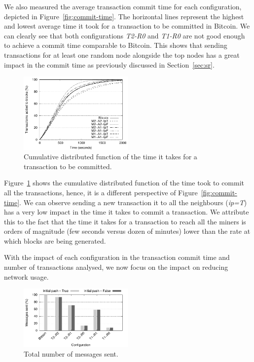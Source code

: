 \documentclass{dads}   %
\begin{document}
We also measured the average transaction commit time for each configuration, depicted in Figure~\ref{fig:commit-time}.   
The horizontal lines represent the highest and lowest average time it took for a transaction to be committed in Bitcoin. We can clearly see that both configurations \textsl{T2-R0} and \textsl{T1-R0} are not good enough to achieve a commit time comparable to Bitcoin.
This shows that sending transactions for at least one random node alongside the top nodes has a great impact in the commit time as previously discussed in Section~\ref{sec:sr}.

\begin{figure}[t]
\centering
\includegraphics[width=0.5\textwidth]{plots/cdf_commit.pdf}
\caption{Cumulative distributed function of the time it takes for a transaction to be committed.}
\label{fig:cdf-commit}
\end{figure}

Figure~\ref{fig:cdf-commit} shows the cumulative distributed function of the time took to commit all the transactions, hence, it is a different perspective of Figure~\ref{fig:commit-time}. We can  observe sending a new transaction it to all the neighbours (\emph{ip=T}) has a very low impact in the time it takes to commit a transaction. 
We attribute this to the fact that the time it takes for a transaction to reach all the miners is orders of magnitude (few seconds versus dozen of minutes) lower than the rate at which blocks are being generated.

With the impact of each configuration in the transaction commit time and number of transactions analysed, we now focus on the impact on reducing network usage.

\begin{figure}[t]
\centering
\includegraphics[width=0.5\textwidth]{plots/msg-sent.pdf}
\caption{Total number of messages sent.}
\label{fig:msg-sent}
\end{figure}
\end{document}
